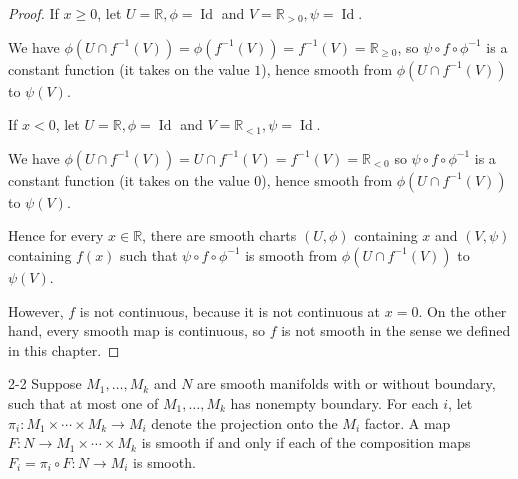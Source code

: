 \begin{proof}
    If \( x \ge 0 \), let \( U = \mathbb{R}, \phi = \operatorname{Id} \) and \( V = \mathbb{R}_{> 0}, \psi = \operatorname{Id} \).

    We have \( \phi(U \cap f^{-1}(V)) = \phi(f^{-1}(V)) = f^{-1}(V) = \mathbb{R}_{\ge 0} \), so \( \psi \circ f \circ \phi^{-1} \) is a constant function (it takes on the value \(1\)), hence smooth from \( \phi(U \cap f^{-1}(V)) \) to \( \psi(V) \).

    If \( x < 0 \), let \( U = \mathbb{R}, \phi = \operatorname{Id} \) and \( V = \mathbb{R}_{< 1} , \psi = \operatorname{Id} \).

    We have \( \phi(U \cap f^{-1}(V)) = U \cap f^{-1}(V) = f^{-1}(V) = \mathbb{R}_{< 0} \) so \( \psi \circ f \circ \phi^{-1} \) is a constant function (it takes on the value \(0\)), hence smooth from \( \phi(U \cap f^{-1}(V)) \) to \( \psi(V) \).

    Hence for every \( x \in \mathbb{R} \), there are smooth charts \( (U, \phi) \) containing \( x \) and \( (V, \psi) \) containing \( f(x) \) such that \( \psi \circ f \circ \phi^{-1} \) is smooth from \( \phi(U \cap f^{-1}(V)) \) to \( \psi(V) \).

    However, \( f \) is not continuous, because it is not continuous at \( x = 0 \). On the other hand, every smooth map is continuous, so \( f \) is not smooth in the sense we defined in this chapter.
\end{proof}

\begin{problem}{2-2}
    Suppose \( M_{1}, \ldots, M_{k} \) and \( N \) are smooth manifolds with or without boundary, such that at most one of \( M_{1}, \ldots, M_{k} \) has nonempty boundary. For each \( i \), let \( \pi_{i}: M_{1} \times \cdots \times M_{k} \to M_{i} \) denote the projection onto the \( M_{i} \) factor. A map \( F: N \to M_{1} \times \cdots \times M_{k} \) is smooth if and only if each of the composition maps \( F_{i} = \pi_{i} \circ F: N \to M_{i} \) is smooth.
\end{problem}

